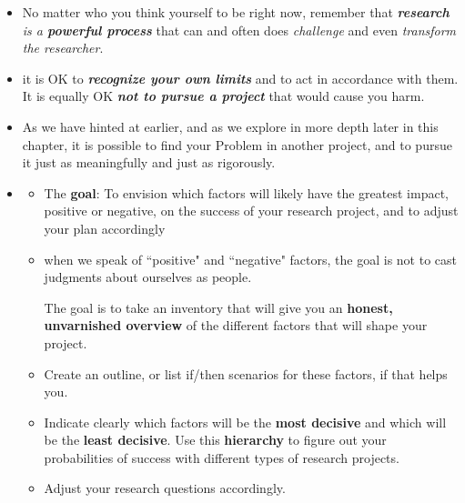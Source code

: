 \documentclass[11pt]{article}
\begin{document}
\begin{itemize}
\item No matter who you think yourself to be right now, remember that \emph{\textbf{research} is a \textbf{powerful process}} that can and often does \emph{challenge} and even \emph{transform the researcher}.

\item it is OK to \emph{\textbf{recognize your own limits}} and to act in accordance with them. It is equally OK \emph{\textbf{not to pursue a project}} that would cause you harm.

\item As we have hinted at earlier, and as we explore in more depth later in this chapter, it is possible to find your Problem in another project, and to pursue it just as meaningfully and just as rigorously.

\item \begin{exercise}
\begin{itemize}
\item The \textbf{goal}: To envision which factors will likely have the greatest impact, positive or negative, on the success of your research project, and to adjust your plan accordingly

\item when we speak of ``positive" and ``negative" factors, the goal is not to cast judgments about ourselves as people. 

The goal is to take an inventory that will give you an \textbf{honest, unvarnished overview} of the different factors that will shape your project.

\item Create an outline, or list if/then scenarios for these factors, if that helps you.

\item Indicate clearly which factors will be the \textbf{most decisive} and which will be the \textbf{least decisive}. Use this \textbf{hierarchy} to figure out your probabilities of success with different types of research projects. 

\item Adjust your research questions accordingly.
\end{itemize}

\end{exercise}
\end{itemize}
\end{document}
